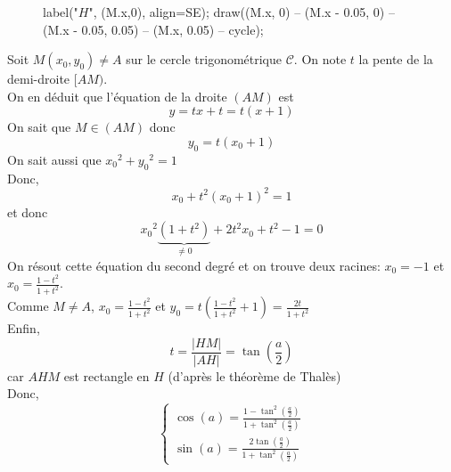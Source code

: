 \begin{prv}
\begin{enumerate}
\begin{figure}[H]
\begin{asy}
					label("$H$", (M.x,0), align=SE);
					draw((M.x, 0) -- (M.x - 0.05, 0) -- (M.x - 0.05, 0.05) -- (M.x, 0.05) -- cycle);
				\end{asy}
			\end{figure}
			Soit $M(x_0,y_0) \neq A$ sur le cercle trigonométrique $\mathcal{C}$. On note $t$ la pente de la demi-droite $[AM)$.\\
			On en déduit que l'équation de la droite $(AM)$ est \[
				y = tx + t = t(x+1)
			\]
			On sait que $M \in (AM)$ donc \[
				y_0 = t(x_0+1)
			\] On sait aussi que ${x_0}^2 + {y_0}^2 = 1$ \\
			Donc, \[
				x_0 + t^2(x_0+1)^2 = 1
			\] et donc \[
				{x_0}^2 \underbrace{(1+t^2)}_{\neq 0} + 2t^2x_0	+ t^2 - 1 = 0
			\] On résout cette équation du second degré et on trouve deux racines: $x_0 = -1$ et $x_0 = \frac{1-t^2}{1+t^2}$.\\
			Comme $M \neq A$, $x_0 = \frac{1-t^2}{1+t^2}$ et $y_0 = t\left( \frac{1-t^2}{1+t^2} + 1 \right) = \frac{2t}{1+t^2}$ \\
			Enfin,  \[
				t = \frac{\left| HM \right| }{\left| AH \right|} = \tan\left( \frac{a}{2} \right) 
			\] car $AHM$ est rectangle en $H$ (d'après le théorème de Thalès)\\
			Donc, \[
				\begin{cases}
					\cos(a) = \frac{1-\tan^2\left( \frac{a}{2} \right)}{1+\tan^2\left( \frac{a}{2} \right)}\\
					\sin(a) = \frac{2\tan\left( \frac{a}{2} \right)}{1+\tan^2\left( \frac{a}{2} \right) }
				\end{cases}
			\] 
	\end{enumerate}
\end{prv}

